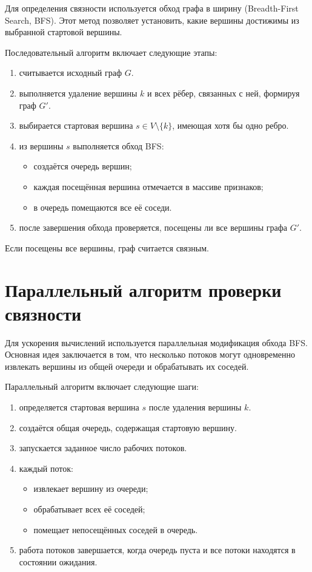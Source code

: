 Для определения связности используется обход графа в ширину (Breadth-First Search, BFS).  
Этот метод позволяет установить, какие вершины достижимы из выбранной стартовой вершины.

Последовательный алгоритм включает следующие этапы:
\begin{enumerate}
	\item считывается исходный граф $G$.
	\item выполняется удаление вершины $k$ и всех рёбер, связанных с ней, формируя граф $G'$.
	\item выбирается стартовая вершина $s \in V \setminus \{k\}$, имеющая хотя бы одно ребро.
	\item из вершины $s$ выполняется обход BFS:
	\begin{itemize}
		\item создаётся очередь вершин;
		\item каждая посещённая вершина отмечается в массиве признаков;
		\item в очередь помещаются все её соседи.
	\end{itemize}
	\item после завершения обхода проверяется, посещены ли все вершины графа $G'$.
\end{enumerate}

Если посещены все вершины, граф считается связным.

\section{Параллельный алгоритм проверки связности}

Для ускорения вычислений используется параллельная модификация обхода BFS.  
Основная идея заключается в том, что несколько потоков могут одновременно извлекать вершины из общей очереди и обрабатывать их соседей.

Параллельный алгоритм включает следующие шаги:
\begin{enumerate}
	\item определяется стартовая вершина $s$ после удаления вершины $k$.
	\item создаётся общая очередь, содержащая стартовую вершину.
	\item запускается заданное число рабочих потоков.
	\item каждый поток:
	\begin{itemize}
		\item извлекает вершину из очереди;
		\item обрабатывает всех её соседей;
		\item помещает непосещённых соседей в очередь.
	\end{itemize}
	\item работа потоков завершается, когда очередь пуста и все потоки находятся в состоянии ожидания.
\end{enumerate}

